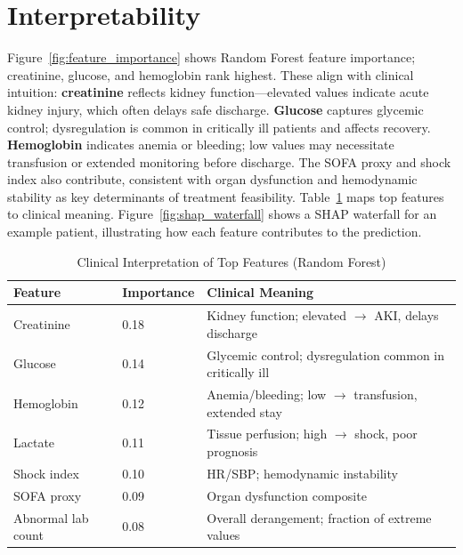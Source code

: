 \section{Interpretability}

Figure~\ref{fig:feature_importance} shows Random Forest feature importance; creatinine, glucose, and hemoglobin rank highest. These align with clinical intuition: \textbf{creatinine} reflects kidney function---elevated values indicate acute kidney injury, which often delays safe discharge. \textbf{Glucose} captures glycemic control; dysregulation is common in critically ill patients and affects recovery. \textbf{Hemoglobin} indicates anemia or bleeding; low values may necessitate transfusion or extended monitoring before discharge. The SOFA proxy and shock index also contribute, consistent with organ dysfunction and hemodynamic stability as key determinants of treatment feasibility. Table~\ref{tab:clinical_interpretation} maps top features to clinical meaning. Figure~\ref{fig:shap_waterfall} shows a SHAP waterfall for an example patient, illustrating how each feature contributes to the prediction.

\begin{table}[htbp]
\centering
\caption{Clinical Interpretation of Top Features (Random Forest)}
\small
\begin{tabular}{llp{5.5cm}}
\toprule
Feature & Importance & Clinical Meaning \\
\midrule
Creatinine & 0.18 & Kidney function; elevated $\to$ AKI, delays discharge \\
Glucose & 0.14 & Glycemic control; dysregulation common in critically ill \\
Hemoglobin & 0.12 & Anemia/bleeding; low $\to$ transfusion, extended stay \\
Lactate & 0.11 & Tissue perfusion; high $\to$ shock, poor prognosis \\
Shock index & 0.10 & HR/SBP; hemodynamic instability \\
SOFA proxy & 0.09 & Organ dysfunction composite \\
Abnormal lab count & 0.08 & Overall derangement; fraction of extreme values \\
\bottomrule
\end{tabular}
\label{tab:clinical_interpretation}
\end{table}

